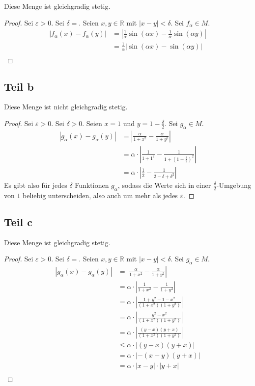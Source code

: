 \documentclass[10pt,a4paper]{article}
\begin{document}
Diese Menge ist gleichgradig stetig.

\begin{proof}
Sei $\varepsilon > 0$.
Sei $\delta = $.
Seien $x, y \in \mathbb{R}$ mit $|x - y| < \delta$.
Sei $f_{\alpha} \in M$.
\begin{align*}
|f_{\alpha}(x) - f_{\alpha}(y)| & = |\frac{1}{\alpha}\sin(\alpha x) - \frac{1}{\alpha}\sin(\alpha y)|\\
& = \frac{1}{\alpha}|\sin(\alpha x) - \sin(\alpha y)|\\
\end{align*}
\end{proof}

\subsection*{Teil b}

Diese Menge ist nicht gleichgradig stetig.

\begin{proof}
Sei $\varepsilon > 0$.
Sei $\delta > 0$.
Seien $x = 1$ und $y = 1 - \frac{\delta}{2}$.
Sei $g_{\alpha} \in M$.
\begin{align*}
|g_{\alpha}(x) - g_{\alpha}(y)| & = |\frac{\alpha}{1 + x^{2}} - \frac{\alpha}{1 + y^{2}}|\\
& = \alpha \cdot |\frac{1}{1 + 1^{2}} - \frac{1}{1 + (1 - \frac{\delta}{2})^{2}}|\\
& = \alpha \cdot |\frac{1}{2} - \frac{1}{2 - \delta + \delta^{2}}|
\end{align*}
Es gibt also für jedes $\delta$ Funktionen $g_{\alpha}$, sodass die Werte sich in einer $\frac{\delta}{2}$-Umgebung von $1$ beliebig unterscheiden, also auch um mehr als jedes $\varepsilon$.
\end{proof}

\subsection*{Teil c}

Diese Menge ist gleichgradig stetig.

\begin{proof}
Sei $\varepsilon > 0$.
Sei $\delta = $.
Seien $x, y \in \mathbb{R}$ mit $|x - y| < \delta$.
Sei $g_{\alpha} \in M$.
\begin{align*}
|g_{\alpha}(x) - g_{\alpha}(y)| & = |\frac{\alpha}{1 + x^{2}} - \frac{\alpha}{1 + y^{2}}|\\
& = \alpha \cdot |\frac{1}{1 + x^{2}} - \frac{1}{1 + y^{2}}|\\
& = \alpha \cdot |\frac{1 + y^{2} - 1 - x^{2}}{(1 + x^{2})(1 + y^{2})}|\\
& = \alpha \cdot |\frac{y^{2} - x^{2}}{(1 + x^{2})(1 + y^{2})}|\\
& = \alpha \cdot |\frac{(y - x)(y + x)}{(1 + x^{2})(1 + y^{2})}|\\
& \le \alpha \cdot |(y - x)(y + x)|\\
& = \alpha \cdot |-(x - y)(y + x)|\\
& = \alpha \cdot |x - y| \cdot |y + x|\\
\end{align*}
\end{proof}
\end{document}
